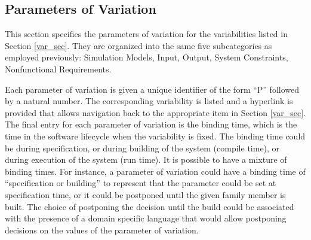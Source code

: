 \documentclass[12pt, notitlepage]{article}
\begin{document}
\newpage
\subsection{Parameters of Variation}
This section specifies the parameters of variation for the variabilities listed in Section \ref{var_sec}. They are organized into the same five subcategories as employed previously: Simulation Models, Input, Output, System Constraints, Nonfunctional Requirements. 

Each parameter of variation is given a unique identifier of the form “P” followed by a natural number. The corresponding variability is listed and a hyperlink is provided that allows navigation back to the appropriate item in Section \ref{var_sec}. The final entry for each parameter of variation is the binding time, which is the time in the software lifecycle when the variability is fixed. The binding time could be during specification, or during building
of the system (compile time), or during execution of the system (run time). It is possible to have a mixture of binding times. For instance, a parameter of variation could have a binding time of “specification or building” to represent that the parameter could be set at specification time, or it could be postponed until the given family member is built. The choice of postponing the decision until the build could be associated with the presence of a domain specific language that would allow postponing decisions on the values of the parameter of variation.
\end{document}

